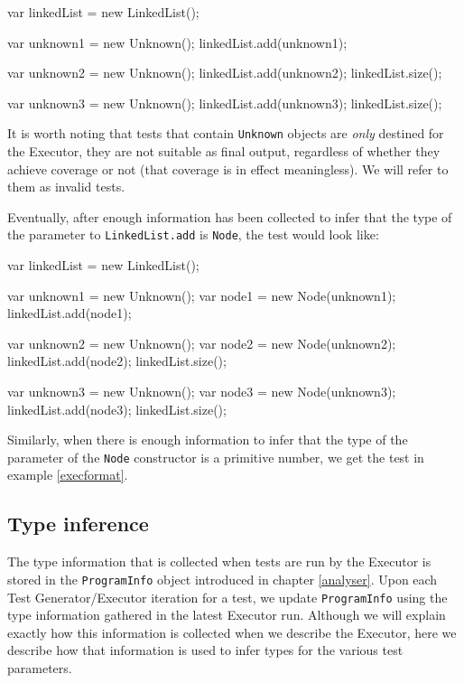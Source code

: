 \begin{code}[caption=Unknown parameter types, label=unknowns]
var linkedList = new LinkedList();

var unknown1 = new Unknown();
linkedList.add(unknown1);

var unknown2 = new Unknown();
linkedList.add(unknown2);
linkedList.size();

var unknown3 = new Unknown();
linkedList.add(unknown3);
linkedList.size();
\end{code}

It is worth noting that tests that contain \texttt{Unknown} objects are \emph{only} destined for the \textsf{Executor}, they are not suitable as final output, regardless of whether they achieve coverage or not (that coverage is in effect meaningless). We will refer to them as invalid tests.

Eventually, after enough information has been collected to infer that the type of the parameter to \texttt{LinkedList.add} is \texttt{Node}, the test would look like:

\begin{code}[caption=After type inference for \texttt{LinkedList.add}, label=firstinference]
   var linkedList = new LinkedList();
   
   var unknown1 = new Unknown();
   var node1 = new Node(unknown1);
   linkedList.add(node1);
   
   var unknown2 = new Unknown();
   var node2 = new Node(unknown2);
   linkedList.add(node2);
   linkedList.size();

   var unknown3 = new Unknown();
   var node3 = new Node(unknown3);
   linkedList.add(node3);
   linkedList.size();
\end{code}

Similarly, when there is enough information to infer that the type of the parameter of the \texttt{Node} constructor is a primitive number, we get the test in example \ref{execformat}.

\subsection{Type inference}
\label{typeinference}
The type information that is collected when tests are run by the \textsf{Executor} is stored in the \texttt{ProgramInfo} object introduced in chapter \ref{analyser}. Upon each \textsf{Test Generator}/\textsf{Executor} iteration for a test, we update \texttt{ProgramInfo} using the type information gathered in the latest \textsf{Executor} run. Although we will explain exactly how this information is collected when we describe the \textsf{Executor}, here we describe how that information is used to infer types for the various test parameters.

